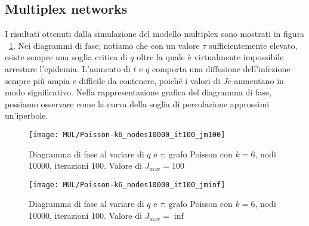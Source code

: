 \subsection{Multiplex networks}\label{subsec:res-multiplex-networks}
    I risultati ottenuti dalla simulazione del modello multiplex sono mostrati in figura ~\ref{fig:diagram_phase_poisson_k_6_jm_100}.
    Nei diagrammi di fase, notiamo che con un valore $\tau$ sufficientemente elevato, esiste sempre una soglia critica
    di $q$ oltre la quale è virtualmente impossibile arrestare l'epidemia.
    L'aumento di $t$ e $q$ comporta una diffusione dell'infezione sempre più ampia e difficile da contenere,
    poiché i valori di $Jc$ aumentano in modo significativo.
    Nella rappresentazione grafica del diagramma di fase,
    possiamo osservare come la curva della soglia di percolazione approssimi un'iperbole.

    \begin{figure}[H]
        \centering
        \texttt{[image: MUL/Poisson-k6\_nodes10000\_it100\_jm100]}
        \caption{Diagramma di fase al variare di $q$ e $\tau$: grafo Poisson con $k=6$, nodi 10000, iterazioni 100. Valore di $J_{\max} = 100$}
        \label{fig:diagram_phase_poisson_k_6_jm_100}
    \end{figure}

    \begin{figure}[H]
        \centering
        \texttt{[image: MUL/Poisson-k6\_nodes10000\_it100\_jminf]}
        \caption{Diagramma di fase al variare di $q$ e $\tau$: grafo Poisson con $k=6$, nodi 10000, iterazioni 100. Valore di $J_{\max} = \inf$}
        \label{fig:digram_phase_poisson_k_6_jm_inf}
    \end{figure}
